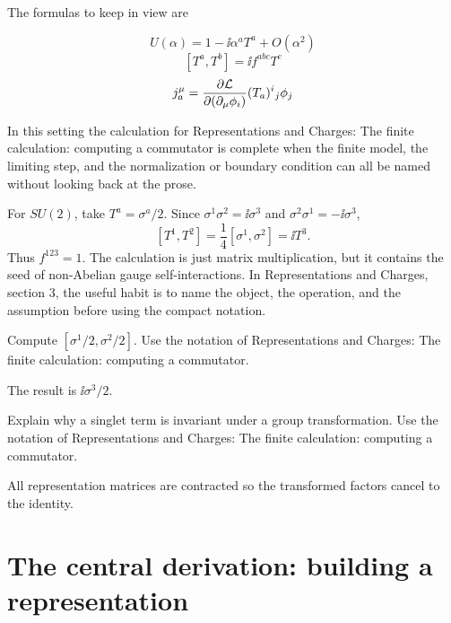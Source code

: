 The formulas to keep in view are

\[
  U(\alpha)=1-\ii\alpha^aT^a+O(\alpha^2)
\]
\[
  [T^a,T^b]=\ii f^{abc}T^c
\]
\[
  j^\mu_a=\frac{\partial\mathcal L}{\partial(\partial_\mu\phi_i)}(T_a)^i{}_j\phi_j
\]

In this setting the calculation for Representations and Charges: The finite calculation: computing a commutator is complete when the finite model, the limiting step, and the normalization or boundary condition can all be named without looking back at the prose.




\begin{example}
For \(SU(2)\), take \(T^a=\sigma^a/2\).  Since \(\sigma^1\sigma^2=\ii\sigma^3\) and \(\sigma^2\sigma^1=-\ii\sigma^3\),
\[
  [T^1,T^2]=\frac14[\sigma^1,\sigma^2]=\ii T^3.
\]
Thus \(f^{123}=1\).  The calculation is just matrix multiplication, but it contains the seed of non-Abelian gauge self-interactions.  In Representations and Charges, section 3, the useful habit is to name the object, the operation, and the assumption before using the compact notation.
\end{example}



\begin{exercise}
Compute \([\sigma^1/2,\sigma^2/2]\).  Use the notation of Representations and Charges: The finite calculation: computing a commutator.
\begin{answer}
The result is \(\ii\sigma^3/2\).
\end{answer}
\end{exercise}

\begin{exercise}
Explain why a singlet term is invariant under a group transformation.  Use the notation of Representations and Charges: The finite calculation: computing a commutator.
\begin{answer}
All representation matrices are contracted so the transformed factors cancel to the identity.
\end{answer}
\end{exercise}



\section{The central derivation: building a representation}

